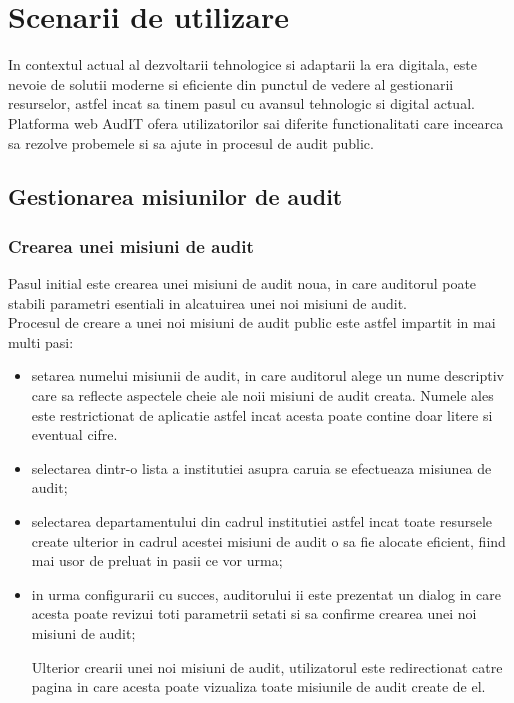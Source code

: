 \chapter{Scenarii de utilizare }

In contextul actual al dezvoltarii tehnologice si adaptarii la era digitala, este nevoie de solutii moderne si eficiente din punctul de vedere al gestionarii resurselor, astfel incat sa tinem pasul cu avansul tehnologic si digital actual.\\
Platforma web AudIT ofera utilizatorilor sai diferite functionalitati care incearca sa rezolve probemele si sa ajute in procesul de audit public.

\section{Gestionarea misiunilor de audit}
\subsection*{Crearea unei misiuni de audit}
Pasul initial este crearea unei misiuni de audit noua, in care auditorul poate stabili parametri esentiali in alcatuirea unei noi misiuni de audit.\\
Procesul de creare a unei noi misiuni de audit public este astfel impartit in mai multi pasi:

\begin{itemize}
	\item   setarea numelui misiunii de audit, in care auditorul alege un nume descriptiv care sa reflecte aspectele cheie ale noii misiuni de audit creata. Numele ales este restrictionat de aplicatie astfel incat acesta poate contine doar litere si eventual cifre.
	
	\item  selectarea dintr-o lista a institutiei asupra caruia se efectueaza misiunea de audit;
	
	\item selectarea departamentului din cadrul institutiei astfel incat toate resursele create ulterior in cadrul acestei misiuni de audit o sa fie alocate eficient, fiind mai usor de preluat in pasii ce vor urma;
	
	\item in urma configurarii cu succes, auditorului ii este prezentat un dialog in care acesta poate revizui toti parametrii setati si sa confirme crearea unei noi misiuni de audit;
	
	Ulterior crearii unei noi misiuni de audit, utilizatorul este redirectionat catre pagina in care acesta poate vizualiza toate misiunile de audit create de el.
\end{itemize}

